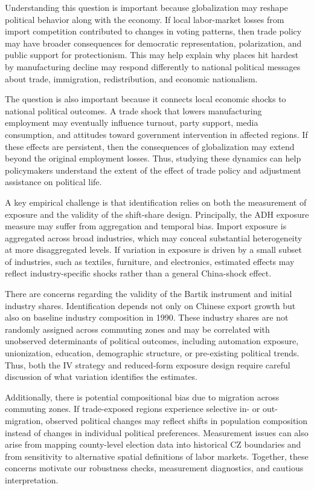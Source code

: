 \documentclass[
  11pt,
]{article}
\begin{document}
Understanding this question is important because globalization may
reshape political behavior along with the economy. If local labor-market
losses from import competition contributed to changes in voting
patterns, then trade policy may have broader consequences for democratic
representation, polarization, and public support for protectionism. This
may help explain why places hit hardest by manufacturing decline may
respond differently to national political messages about trade,
immigration, redistribution, and economic nationalism.

The question is also important because it connects local economic shocks
to national political outcomes. A trade shock that lowers manufacturing
employment may eventually influence turnout, party support, media
consumption, and attitudes toward government intervention in affected
regions. If these effects are persistent, then the consequences of
globalization may extend beyond the original employment losses. Thus,
studying these dynamics can help policymakers understand the extent of
the effect of trade policy and adjustment assistance on political life.

A key empirical challenge is that identification relies on both the
measurement of exposure and the validity of the shift-share design.
Principally, the ADH exposure measure may suffer from aggregation and
temporal bias. Import exposure is aggregated across broad industries,
which may conceal substantial heterogeneity at more disaggregated
levels. If variation in exposure is driven by a small subset of
industries, such as textiles, furniture, and electronics, estimated
effects may reflect industry-specific shocks rather than a general
China-shock effect.

There are concerns regarding the validity of the Bartik instrument and
initial industry shares. Identification depends not only on Chinese
export growth but also on baseline industry composition in 1990. These
industry shares are not randomly assigned across commuting zones and may
be correlated with unobserved determinants of political outcomes,
including automation exposure, unionization, education, demographic
structure, or pre-existing political trends. Thus, both the IV strategy
and reduced-form exposure design require careful discussion of what
variation identifies the estimates.

Additionally, there is potential compositional bias due to migration
across commuting zones. If trade-exposed regions experience selective
in- or out-migration, observed political changes may reflect shifts in
population composition instead of changes in individual political
preferences. Measurement issues can also arise from mapping county-level
election data into historical CZ boundaries and from sensitivity to
alternative spatial definitions of labor markets. Together, these
concerns motivate our robustness checks, measurement diagnostics, and
cautious interpretation.
\end{document}
